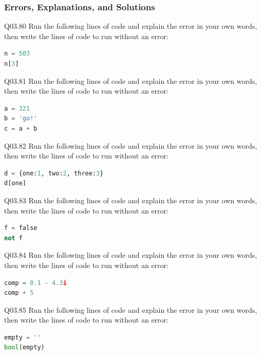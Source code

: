 \documentclass{book}
\newenvironment{problems}{}{}  %
\begin{document}
    
        \begin{problems}
        \subsubsection{Errors, Explanations, and
Solutions}\label{errors-explanations-and-solutions}

Q03.80 Run the following lines of code and explain the error in your own
words, then write the lines of code to run without an error:

\begin{lstlisting}[language=Python]
n = 503
n[3]
\end{lstlisting}

Q03.81 Run the following lines of code and explain the error in your own
words, then write the lines of code to run without an error:

\begin{lstlisting}[language=Python]
a = 321
b = 'go!'
c = a + b
\end{lstlisting}

Q03.82 Run the following lines of code and explain the error in your own
words, then write the lines of code to run without an error:

\begin{lstlisting}[language=Python]
d = {one:1, two:2, three:3}
d[one]
\end{lstlisting}

Q03.83 Run the following lines of code and explain the error in your own
words, then write the lines of code to run without an error:

\begin{lstlisting}[language=Python]
f = false
not f
\end{lstlisting}

Q03.84 Run the following lines of code and explain the error in your own
words, then write the lines of code to run without an error:

\begin{lstlisting}[language=Python]
comp = 0.1 - 4.3i
comp + 5
\end{lstlisting}

Q03.85 Run the following lines of code and explain the error in your own
words, then write the lines of code to run without an error:

\begin{lstlisting}[language=Python]
empty = ''
bool(empty)
\end{lstlisting}


\end{problems}
\end{document}
